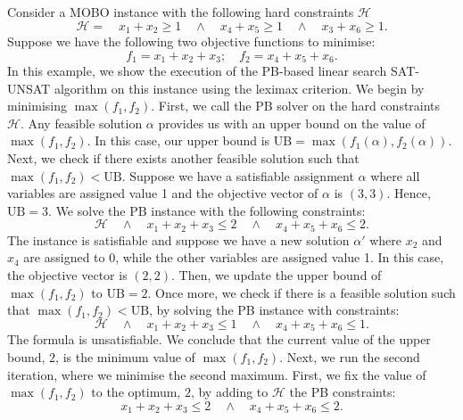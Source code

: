 \documentclass[a4paper,UKenglish,cleveref, autoref, thm-restate]{lipics-v2021}
\newcommand{\UB}{\text{UB}}
\begin{document}
\begin{example}
\label{eg:pb-sat-unsat}

Consider a MOBO instance with the following hard constraints $\mathcal{H}$
\begin{equation*}
    \mathcal{H} = \quad x_1 + x_2 \geq 1 \quad  \wedge \quad x_4 + x_5 \geq 1 \quad 
    \wedge \quad x_3 + x_6 \geq 1.
\end{equation*}
Suppose we have the following two objective functions to minimise:
\begin{equation*}
    f_1 = x_1 + x_2 + x_3; \quad f_2 = x_4 + x_5 + x_6.
\end{equation*}
In this example, we show the execution of the PB-based linear search SAT-UNSAT algorithm on this instance using the leximax criterion.
We begin by minimising $\max(f_1,f_2)$.
First, we call the PB solver on the hard constraints $\mathcal{H}$.
Any feasible solution $\alpha$ provides us with an upper bound on the value of $\max(f_1,f_2)$.
In this case, our upper bound is $\UB = \max(f_1(\alpha),f_2(\alpha))$.
Next, we check if there exists another feasible solution such that $\max(f_1,f_2) < \UB$.
Suppose we have a satisfiable assignment $\alpha$ where all variables are assigned value 1 and the objective vector of $\alpha$ is $(3,3)$.
Hence, $\UB = 3$. We solve the PB instance with the following constraints:
\begin{equation*}
    \mathcal{H} \quad \wedge \quad x_1 + x_2 + x_3 \leq 2 \quad \wedge \quad x_4 + x_5 + x_6 \leq 2.
\end{equation*}
The instance is satisfiable and suppose we have a new solution
$\alpha'$ where $x_2$ and $x_4$ are assigned to 0, while the other variables
are assigned value 1. In this case, the objective vector is $(2,2)$.
Then, we update the upper bound of $\max(f_1,f_2)$ to $\UB = 2$.
Once more, we check if there is a feasible solution such that $\max(f_1,f_2)<\UB$, by solving the PB instance with constraints:
\begin{equation*}
    \mathcal{H} \quad \wedge \quad x_1 + x_2 + x_3 \leq 1 \quad \wedge \quad x_4 + x_5 + x_6 \leq 1.
\end{equation*}
The formula is unsatisfiable. We conclude that the current value of the upper bound, $2$, is the minimum value of $\max(f_1,f_2)$.
Next, we run the second iteration, where we minimise the second maximum.
First, we fix the value of $\max(f_1,f_2)$ to the optimum, $2$, by adding to $\mathcal{H}$ the PB constraints:
\begin{equation*}
x_1 + x_2 + x_3 \leq 2 \quad \wedge \quad x_4 + x_5 + x_6 \leq 2.

\end{equation*}
\end{example}
\end{document}
